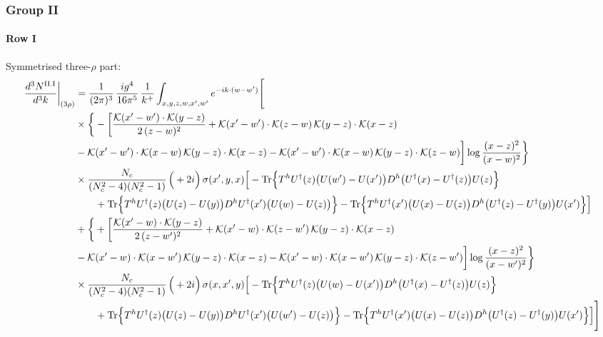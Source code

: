 \documentclass[9pt]{article}
\numberwithin{equation}{section}
\begin{document}
\subsubsection{Group II}
\paragraph*{Row I}
Symmetrised three-$\rho$ part:
\begin{align}
\frac{d^{3}N^{\rm II.I}}{d^{3}k}\bigg|_{(3\rho)}&=\frac{1}{(2\pi)^{3}}\,\frac{ig^{4}}{16\pi^{5}}\,\frac{1}{k^{+}}\int_{x,y,z,w,x',w'}e^{-ik\cdot(w-w')}\Bigg[\notag\\
&\times\bigg\{-\bigg[\frac{\mathcal{K}(x'-w')\cdot\mathcal{K}(y-z)}{2\,(z-w)^{2}}+\mathcal{K}(x'-w')\cdot\mathcal{K}(z-w)\,\mathcal{K}(y-z)\cdot\mathcal{K}(x-z)\notag\\
&-\mathcal{K}(x'-w')\cdot\mathcal{K}(x-w)\,\mathcal{K}(y-z)\cdot\mathcal{K}(x-z)-\mathcal{K}(x'-w')\cdot\mathcal{K}(x-w)\,\mathcal{K}(y-z)\cdot\mathcal{K}(z-w)\bigg]\log\frac{(x-z)^{2}}{(x-w)^{2}}\bigg\}\notag\\
&\times \frac{N_{c}}{(N_{c}^{2}-4)(N_{c}^{2}-1)}\,\Big(+2i\Big)\,\sigma(x',y,x)\Big[-{\rm Tr}\Big\{T^{h}U^{\dagger}(z)\big(U(w')-U(x')\big)D^{h}\big(U^{\dagger}(x)-U^{\dagger}(z)\big)U(z)\Big\}\notag\\&\qquad+{\rm Tr}\Big\{T^{h}U^{\dagger}(z)\big(U(z)-U(y)\big)D^{h}U^{\dagger}(x')\big(U(w)-U(z)\big)\Big\}-{\rm Tr}\Big\{T^{h}U^{\dagger}(x')\big(U(x)-U(z)\big)D^{h}\big(U^{\dagger}(z)-U^{\dagger}(y)\big)U(x')\Big\}\Big]\notag\\
&+\bigg\{+\bigg[\frac{\mathcal{K}(x'-w)\cdot\mathcal{K}(y-z)}{2\,(z-w')^{2}}+\mathcal{K}(x'-w)\cdot\mathcal{K}(z-w')\,\mathcal{K}(y-z)\cdot\mathcal{K}(x-z)\notag\\
&-\mathcal{K}(x'-w)\cdot\mathcal{K}(x-w')\,\mathcal{K}(y-z)\cdot\mathcal{K}(x-z)-\mathcal{K}(x'-w)\cdot\mathcal{K}(x-w')\,\mathcal{K}(y-z)\cdot\mathcal{K}(z-w')\bigg]\log\frac{(x-z)^{2}}{(x-w')^{2}}\bigg\}\notag\\
&\times \frac{N_{c}}{(N_{c}^{2}-4)(N_{c}^{2}-1)}\,\Big(+2i\Big)\,\sigma(x,x',y)\Big[-{\rm Tr}\Big\{T^{h}U^{\dagger}(z)\big(U(w)-U(x')\big)D^{h}\big(U^{\dagger}(x)-U^{\dagger}(z)\big)U(z)\Big\}\notag\\&\qquad+{\rm Tr}\Big\{T^{h}U^{\dagger}(z)\big(U(z)-U(y)\big)D^{h}U^{\dagger}(x')\big(U(w')-U(z)\big)\Big\}-{\rm Tr}\Big\{T^{h}U^{\dagger}(x')\big(U(x)-U(z)\big)D^{h}\big(U^{\dagger}(z)-U^{\dagger}(y)\big)U(x')\Big\}\Big]\Bigg]\label{eq:S-II.I-3}
\end{align}
\end{document}
